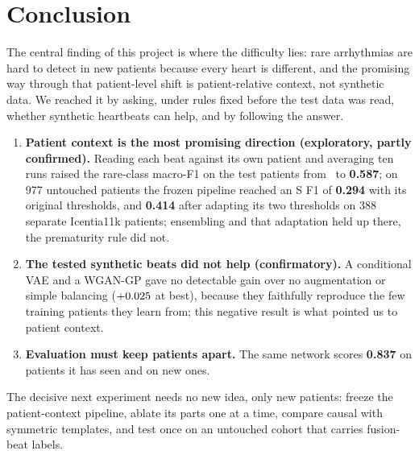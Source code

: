 \documentclass[10pt,a4paper]{article}
\begin{document}
\section{Conclusion}\label{sec:conclusion}
The central finding of this project is where the difficulty lies: rare arrhythmias are hard to detect in new patients because every
heart is different, and the promising way through that patient-level shift is patient-relative context, not synthetic data. We reached
it by asking, under rules fixed before the test data was read, whether synthetic heartbeats can help, and by following the answer.
\begin{enumerate}\setlength{\itemsep}{1pt}
\item \textbf{Patient context is the most promising direction (exploratory, partly confirmed).} Reading each beat against its own
patient and averaging ten runs raised the rare-class macro-F1 on the test patients from \TestCnnCvaeRare\ to \textbf{0.587}; on 977
untouched patients the frozen pipeline reached an S F1 of \textbf{0.294} with its original thresholds, and \textbf{0.414} after
adapting its two thresholds on 388 separate Icentia11k patients; ensembling and that adaptation held up there, the prematurity rule
did not.
\item \textbf{The tested synthetic beats did not help (confirmatory).} A conditional VAE and a WGAN-GP gave no detectable gain over no
augmentation or simple balancing ($+0.025$ at best), because they faithfully reproduce the few training patients they
learn from; this negative result is what pointed us to patient context.
\item \textbf{Evaluation must keep patients apart.} The same network scores \textbf{0.837} on patients it has seen and
\textbf{\TestCnnNoneRare} on new ones.
\end{enumerate}
The decisive next experiment needs no new idea, only new patients: freeze the patient-context pipeline, ablate its parts one at a time,
compare causal with symmetric templates, and test once on an untouched cohort that carries fusion-beat labels.

\begingroup\footnotesize


\endgroup
\end{document}
